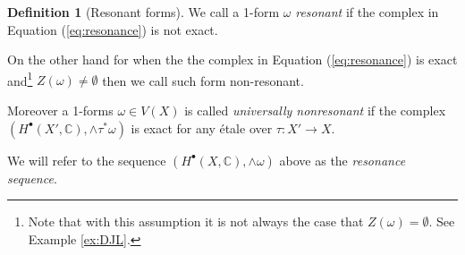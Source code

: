 \documentclass[11pt,reqno]{amsart}
\theoremstyle{definition}
\newtheorem{definition}[theorem]{Definition}
\theoremstyle{remark}
\theoremstyle{cited}
\theoremstyle{citeddef}
\newcommand{\C}{\mathbb{C}}
\newcommand{\bbC}{\mathbb{C}}
\begin{document}
\begin{definition}[Resonant forms]\label{def:resonance}
We call a 1-form $\omega$ \emph{resonant} if the complex 
in Equation (\ref{eq:resonance}) is not exact. 

On the other hand for when the the complex 
in Equation (\ref{eq:resonance}) is exact and\footnote{Note that
with this assumption it is not always the case that $Z(\omega) = \emptyset$. See Example \ref{ex:DJL}.} 
$Z(\omega) \neq \emptyset$ then we call such form non-resonant. 

Moreover a 1-forms $\omega\in V(X)$ is called \emph{universally nonresonant} if the complex
\newline $(H^{\bullet}(X',\bbC), \wedge\tau^*\omega)$
 is exact for any \'etale over $\tau\colon X'\to X$. 

We will refer to the sequence $(H^{\bullet}(X,\bbC), \wedge\omega)$ above as the \emph{resonance sequence}.
\end{definition}
\end{document}

